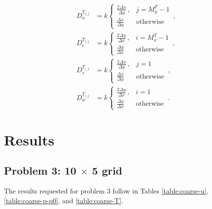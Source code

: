 \documentclass{article}
\begin{document}
\begin{subequations}
	\begin{align}
		D^{T_{i,j}}_n & = k \begin{cases} \frac{2\Delta x}{\Delta y}\,, & j = M_y^T - 1 \\ \frac{\Delta x}{\Delta y} & \text{otherwise}\end{cases}\,,\\
		D^{T_{i,j}}_e & = k \begin{cases} \frac{2\Delta y}{\Delta x}\,, & i = M_x^T - 1 \\ \frac{\Delta y}{\Delta x} & \text{otherwise}\end{cases}\,,\\
		D^{T_{i,j}}_s & = k \begin{cases} \frac{2\Delta x}{\Delta y}\,, & j = 1 \\ \frac{\Delta x}{\Delta y} & \text{otherwise}\end{cases}\,,\\
		D^{T_{i,j}}_w & = k \begin{cases} \frac{2\Delta y}{\Delta x}\,, & i = 1 \\ \frac{\Delta y}{\Delta x} & \text{otherwise}\end{cases}\,.
	\end{align}
\end{subequations}

\section{Results}

\subsection{Problem 3: 10 $\times$ 5 grid}

The results requested for problem 3 follow in Tables \ref{table:coarse-u}, \ref{table:coarse-p-p0}, and \ref{table:coarse-T}.
\end{document}

